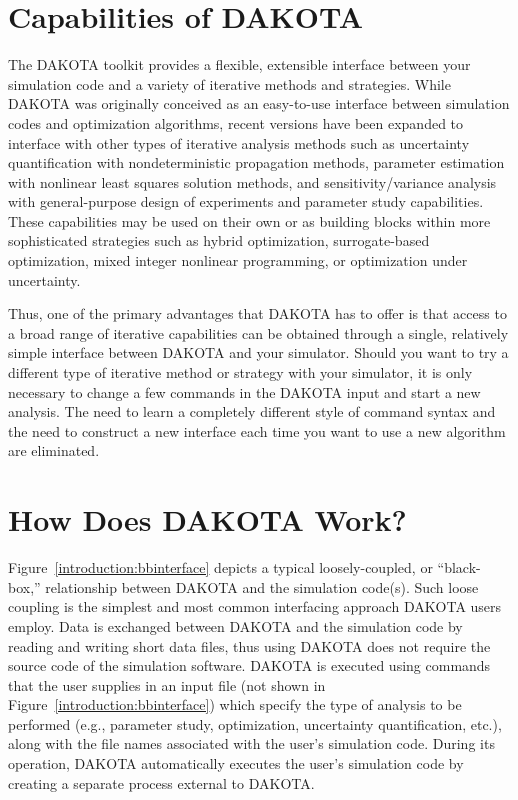\section{Capabilities of DAKOTA}\label{introduction:capabilities}

The DAKOTA toolkit provides a flexible, extensible interface between
your simulation code and a variety of iterative methods and
strategies. While DAKOTA was originally conceived as an easy-to-use
interface between simulation codes and optimization algorithms, recent
versions have been expanded to interface with other types of iterative
analysis methods such as uncertainty quantification with
nondeterministic propagation methods, parameter estimation with
nonlinear least squares solution methods, and sensitivity/variance
analysis with general-purpose design of experiments and parameter
study capabilities. These capabilities may be used on their own or as
building blocks within more sophisticated strategies such as hybrid
optimization, surrogate-based optimization, mixed integer nonlinear
programming, or optimization under uncertainty.

Thus, one of the primary advantages that DAKOTA has to offer is that
access to a broad range of iterative capabilities can be obtained
through a single, relatively simple interface between DAKOTA and your
simulator. Should you want to try a different type of iterative method
or strategy with your simulator, it is only necessary to change a few
commands in the DAKOTA input and start a new analysis. The need to
learn a completely different style of command syntax and the need to
construct a new interface each time you want to use a new algorithm
are eliminated.

\section{How Does DAKOTA Work?}\label{introduction:how}

Figure~\ref{introduction:bbinterface} depicts a typical
loosely-coupled, or ``black-box,'' relationship between DAKOTA and the
simulation code(s).  Such loose coupling is the simplest and most
common interfacing approach DAKOTA users employ. Data is exchanged
between DAKOTA and the simulation code by reading and writing short
data files, thus using DAKOTA does not require the source code of the
simulation software. DAKOTA is executed using commands that the user
supplies in an input file (not shown in
Figure~\ref{introduction:bbinterface}) which specify the type of
analysis to be performed (e.g., parameter study, optimization,
uncertainty quantification, etc.), along with the file names
associated with the user's simulation code. During its operation,
DAKOTA automatically executes the user's simulation code by creating a
separate process external to DAKOTA.

